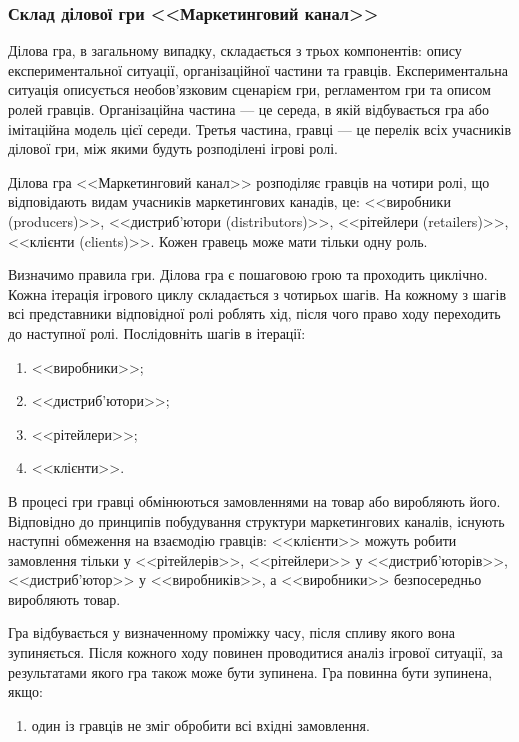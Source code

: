 \subsubsection{Склад ділової гри <<Маркетинговий канал>>}
Ділова гра, в загальному випадку, складається з трьох компонентів: опису експериментальної ситуації, організаційної частини та гравців. Експериментальна ситуація описується необов’язковим сценарієм гри, регламентом гри та описом ролей гравців. Організаційна частина --- це середа, в якій відбувається гра або імітаційна модель цієї середи. Третья частина, гравці --- це перелік всіх учасників ділової гри, між якими будуть розподілені ігрові ролі.

Ділова гра <<Маркетинговий канал>> розподіляє гравців на чотири ролі, що відповідають видам учасників маркетингових канадів, це: <<виробники (producers)>>, <<дистриб’ютори (distributors)>>, <<рітейлери (retailers)>>, <<клієнти (clients)>>. Кожен гравець може мати тільки одну роль.

Визначимо правила гри. Ділова гра є пошаговою грою та проходить циклічно. Кожна ітерація ігрового циклу складається з чотирьох шагів. На кожному з шагів всі представники відповідної ролі роблять хід, після чого право ходу переходить до наступної ролі. Послідовніть шагів в ітерації:
\begin{enumerate} %
\item <<виробники>>;
\item <<дистриб’ютори>>;
\item <<рітейлери>>;
\item <<клієнти>>.
\end{enumerate}

В процесі гри гравці обмінюються замовленнями на товар або виробляють його. Відповідно до принципів побудування структури маркетингових каналів, існують наступні обмеження на взаємодію гравців: <<клієнти>> можуть робити замовлення тільки у <<рітейлерів>>, <<рітейлери>> у <<дистриб’юторів>>, <<дистриб’ютор>> у <<виробників>>, а <<виробники>> безпосередньо виробляють товар.

Гра відбувається у визначенному проміжку часу, після спливу якого вона зупиняється. Після кожного ходу повинен проводитися аналіз ігрової ситуації, за результатами якого гра також може бути зупинена. Гра повинна бути зупинена, якщо: 
\begin{enumerate}
\item один із гравців не зміг обробити всі вхідні замовлення.
\end{enumerate}
 
